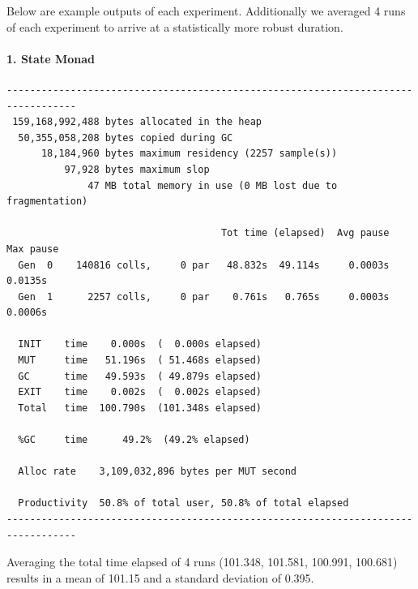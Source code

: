 Below are example outputs of each experiment. Additionally we averaged 4 runs of each experiment to arrive at a statistically more robust duration.

\paragraph{1. State Monad}
\begin{verbatim}
----------------------------------------------------------------------------------
 159,168,992,488 bytes allocated in the heap
  50,355,058,208 bytes copied during GC
      18,184,960 bytes maximum residency (2257 sample(s))
          97,928 bytes maximum slop
              47 MB total memory in use (0 MB lost due to fragmentation)

                                     Tot time (elapsed)  Avg pause  Max pause
  Gen  0    140816 colls,     0 par   48.832s  49.114s     0.0003s    0.0135s
  Gen  1      2257 colls,     0 par    0.761s   0.765s     0.0003s    0.0006s

  INIT    time    0.000s  (  0.000s elapsed)
  MUT     time   51.196s  ( 51.468s elapsed)
  GC      time   49.593s  ( 49.879s elapsed)
  EXIT    time    0.002s  (  0.002s elapsed)
  Total   time  100.790s  (101.348s elapsed)

  %GC     time      49.2%  (49.2% elapsed)

  Alloc rate    3,109,032,896 bytes per MUT second

  Productivity  50.8% of total user, 50.8% of total elapsed
----------------------------------------------------------------------------------
\end{verbatim}

Averaging the total time elapsed of 4 runs (101.348, 101.581, 100.991, 100.681) results in a mean of 101.15 and a standard deviation of 0.395.

